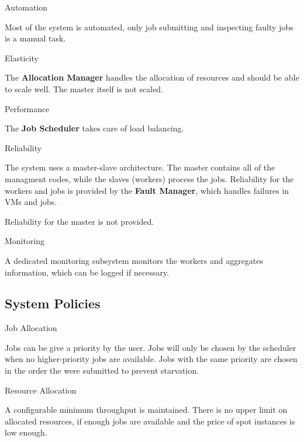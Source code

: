 \documentclass[a4paper]{IEEEtran}
\begin{document}
\begin{LaTeXdescription}
\item[Automation]

Most of the system is automated, only job submitting and inspecting faulty jobs is a manual task.

\item[Elasticity]

The \textbf{Allocation Manager} handles the allocation of resources and should be able to scale well. The master itself is not scaled.

\item[Performance]

The \textbf{Job Scheduler} takes care of load balancing.

\item[Reliability]

The system uses a master-slave architecture. The master contains all of the managment codes, while the slaves (workers) process the jobs. Reliability for the workers and jobs is provided by the \textbf{Fault Manager}, which handles failures in VMs and jobs.

Reliability for the master is not provided.

\item[Monitoring]

A dedicated monitoring subsystem monitors the workers and aggregates information, which can be logged if necessary.

\end{LaTeXdescription}

\subsection*{System Policies}

\begin{LaTeXdescription}

\item[Job Allocation]

Jobs can be give a priority by the user. Jobs will only be chosen by the scheduler when no higher-priority jobs are available. Jobs with the same priority are chosen in the order the were submitted to prevent starvation.

\item[Resource Allocation]

A configurable minimum throughput is maintained. There is no upper limit on allocated resources, if enough jobs are available and the price of spot instances is low enough.

\end{LaTeXdescription}
\end{document}
